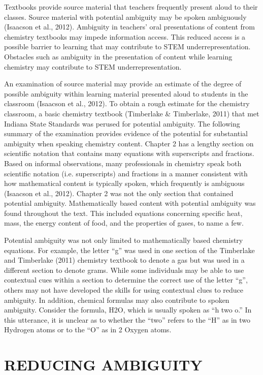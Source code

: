\documentclass[11.5pt]{sig-alternate} %
\begin{document}
\begin{large}
Textbooks provide source material that teachers frequently present aloud to their classes. Source material with potential ambiguity may be spoken ambiguously (Isaacson et al., 2012). Ambiguity in teachers' oral presentations of content from chemistry textbooks may impede information access. This reduced access is a possible barrier to learning that may contribute to STEM underrepresentation. Obstacles such as ambiguity in the presentation of content while learning chemistry may contribute to STEM underrepresentation.

An examination of source material may provide an estimate of the degree of possible ambiguity within learning material presented aloud to students in the classroom (Isaacson et al., 2012). To obtain a rough estimate for the chemistry classroom, a basic chemistry textbook (Timberlake \& Timberlake, 2011) that met Indiana State Standards was perused for potential ambiguity. The following summary of the examination provides evidence of the potential for substantial ambiguity when speaking chemistry content. Chapter 2 has a lengthy section on scientific notation that contains many equations with superscripts and fractions. Based on informal observations, many professionals in chemistry speak both scientific notation (i.e. superscripts) and fractions in a manner consistent with how mathematical content is typically spoken, which frequently is ambiguous (Isaacson et al., 2012). Chapter 2 was not the only section that contained potential ambiguity. Mathematically based content with potential ambiguity was found throughout the text. This included equations concerning specific heat, mass, the energy content of food, and the properties of gases, to name a few.

Potential ambiguity was not only limited to mathematically based chemistry equations. For example, the letter ``g'' was used in one section of the Timberlake and Timberlake (2011) chemistry textbook to denote a gas but was used in a different section to denote grams. While some individuals may be able to use contextual cues within a section to determine the correct use of the letter ``g'', others may not have developed the skills for using contextual clues to reduce ambiguity. In addition, chemical formulas may also contribute to spoken ambiguity. Consider the formula, H2O, which is usually spoken as ``h two o.'' In this utterance, it is unclear as to whether the ``two'' refers to the ``H'' as in two Hydrogen atoms or to the ``O'' as in 2 Oxygen atoms.  

\section*{REDUCING AMBIGUITY}


\end{large}
\end{document}
